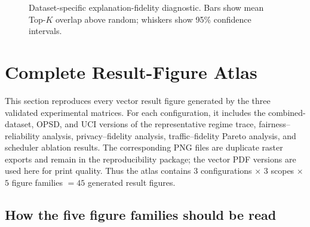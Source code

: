 \documentclass[10pt,conference]{IEEEtran}
\begin{document}
\begin{figure}[htbp]
\centering
{}
\caption{Dataset-specific explanation-fidelity diagnostic. Bars show mean
Top-$K$ overlap above random; whiskers show 95\% confidence intervals.}
\label{fig:topk}
\end{figure}

\FloatBarrier


\FloatBarrier
\section{Complete Result-Figure Atlas}

This section reproduces every vector result figure generated by the three
validated experimental matrices. For each configuration, it includes the
combined-dataset, OPSD, and UCI versions of the representative regime trace,
fairness--reliability analysis, privacy--fidelity analysis, traffic--fidelity
Pareto analysis, and scheduler ablation results. The corresponding PNG files
are duplicate raster exports and remain in the reproducibility package; the
vector PDF versions are used here for print quality. Thus the atlas contains
$3$ configurations $\times$ $3$ scopes $\times$ $5$ figure families $=45$
generated result figures.

\subsection{How the five figure families should be read}
\end{document}
